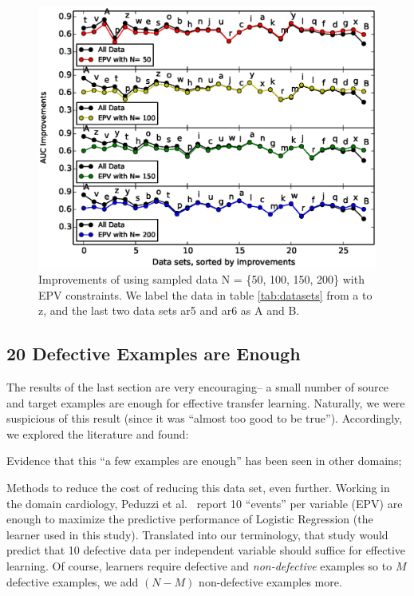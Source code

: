 \begin{figure}[!htp]
	\centering
	\includegraphics[width=\linewidth]{Figures/raleigh/sample_epv.eps}
	\caption{Improvements of using sampled data N = \{50, 100, 150, 200\} with EPV constraints. We label the data in table \ref{tab:datasets} from a to z, and the last two data sets ar5 and ar6 as A and B.}
	\label{fig:small_epv}
\end{figure}


\subsection{20 Defective Examples  are Enough}


The results of the last section are very encouraging-- a small number of source
and target examples are enough for effective transfer learning. Naturally,
we were suspicious of this result (since it was ``almost too good to be true'').
Accordingly, we explored the literature and found:
\bi
\item Evidence that this ``a few examples are enough'' has been seen in other domains;
\item Methods to reduce the cost of reducing this data set, even further.
  \ei
Working in the domain cardiology,
  Peduzzi et al.~\cite{peduzzi1996simulation}
  report 10 ``events'' per variable (EPV) are enough to maximize the predictive performance
  of  Logistic Regression (the learner used in this study). Translated into our terminology,
  that study would predict that  10 defective data per independent variable should
  suffice for effective learning. Of course, learners require defective and {\em non-defective}
  examples so to $M$ defective examples, we add $(N-M)$ non-defective examples more.

